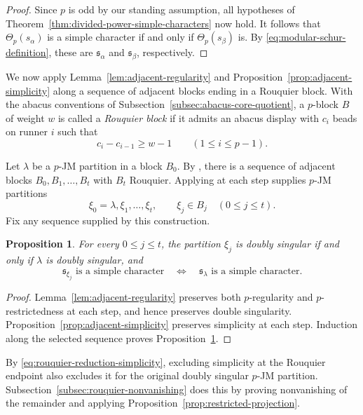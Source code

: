 \documentclass[12pt,reqno,a4paper]{amsart}
\numberwithin{equation}{section}
\numberwithin{figure}{section}
\theoremstyle{plain}
\newtheorem{proposition}[theorem]{Proposition}
\theoremstyle{definition}
\begin{document}
\begin{proof}
Since $p$ is odd by our standing assumption, all hypotheses of
Theorem~\ref{thm:divided-power-simple-characters} now hold.
It follows that $\Theta_p(s_\alpha)$ is a simple character if and
only if $\Theta_p(s_\beta)$ is.  By
\eqref{eq:modular-schur-definition}, these are
$\mathfrak{s}_\alpha$ and $\mathfrak{s}_\beta$, respectively.
\end{proof}

We now apply Lemma~\ref{lem:adjacent-regularity} and
Proposition~\ref{prop:adjacent-simplicity} along a sequence of
adjacent blocks ending in a Rouquier block.  With the abacus conventions of
Subsection~\ref{subsec:abacus-core-quotient}, a $p$-block $B$ of weight
$w$ is called a \emph{Rouquier block} if it admits an abacus display with
$c_i$ beads on runner $i$ such that
\begin{equation}\label{eq:rouquier-definition}
c_i-c_{i-1}\geq w-1
\qquad(1\leq i\leq p-1).
\end{equation}

Let $\lambda$ be a $p$-JM partition in a block $B_0$.
By \cite[Lemma~3.1]{Fayers}, there is a sequence of adjacent
blocks $B_0,B_1,\ldots,B_t$ with $B_t$ Rouquier.
Applying \cite[Lemma~3.2]{Fayers} at each step supplies $p$-JM partitions
\[
\xi_0=\lambda,\xi_1,\ldots,\xi_t,
\qquad \xi_j\in B_j\quad(0\leq j\leq t).
\]
Fix any sequence supplied by this construction.

\begin{proposition}
\label{prop:rouquier-reduction}
For every $0\leq j\leq t$, the partition $\xi_j$ is doubly singular
if and only if $\lambda$ is doubly singular, and
\begin{equation}\label{eq:rouquier-reduction-simplicity}
\mathfrak{s}_{\xi_j}\text{ is a simple character}
\quad\Longleftrightarrow\quad
\mathfrak{s}_{\lambda}\text{ is a simple character}.
\end{equation}
\end{proposition}

\begin{proof}
Lemma~\ref{lem:adjacent-regularity} preserves both $p$-regularity and
$p$-restrictedness at each step, and hence preserves double
singularity.  Proposition~\ref{prop:adjacent-simplicity} preserves
simplicity at each step.  Induction along the selected sequence
proves Proposition~\ref{prop:rouquier-reduction}.
\end{proof}

By \eqref{eq:rouquier-reduction-simplicity}, excluding simplicity at
the Rouquier endpoint also excludes it for the original doubly
singular $p$-JM partition.  Subsection~\ref{subsec:rouquier-nonvanishing}
does this by proving nonvanishing of the remainder and applying
Proposition~\ref{prop:restricted-projection}.
\end{document}
